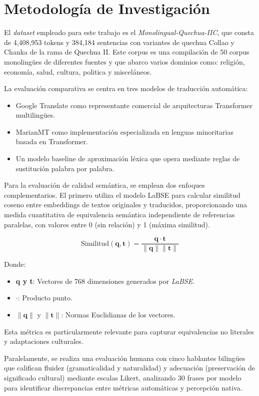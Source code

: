 \section{Metodología de Investigación}

El \textit{dataset} empleado para este trabajo es el \textit{Monolingual-Quechua-IIC}, que consta de 4,408,953 tokens y 384,184 sentencias con variantes de quechua Collao y Chanka de la rama de Quechua II. Este corpus es una compilación de 50 corpus monolingües de diferentes fuentes y que abarco varios dominios como: religión, economía, salud, cultura, politica y misceláneos.


La evaluación comparativa se centra en tres modelos de traducción automática:
\begin{itemize}
	\item Google Translate como representante comercial de arquitecturas Transformer multilingües.
	\item MarianMT como implementación especializada en lenguas minoritarias basada en Transformer.
	\item Un modelo baseline de aproximación léxica que opera mediante reglas de sustitución palabra por palabra.

\end{itemize}

Para la evaluación de calidad semántica, se emplean dos enfoques complementarios. El primero utiliza el modelo LaBSE para calcular similitud coseno entre embeddings de textos originales y traducidos, proporcionando una medida cuantitativa de equivalencia semántica independiente de referencias paralelas, con valores entre 0 (sin relación) y 1 (máxima similitud).

\[
	\text{Similitud}(\mathbf{q}, \mathbf{t}) = \frac{\mathbf{q} \cdot \mathbf{t}}{\|\mathbf{q}\| \|\mathbf{t}\|}
\]

Donde:
\begin{itemize}
	\item \textbf{q y t}: Vectores de 768 dimensiones generados por \textit{LaBSE}.
	\item $\cdot$: Producto punto.
	\item $\|\mathbf{q}\|$ y $\|\mathbf{t}\|$: Normas Euclidianas de los vectores.
\end{itemize}

Esta métrica es particularmente relevante para capturar equivalencias no literales y adaptaciones culturales.

Paralelamente, se realiza una evaluación humana con cinco hablantes bilingües que califican fluidez (gramaticalidad y naturalidad) y adecuación (preservación de significado cultural) mediante escalas Likert, analizando 30 frases por modelo para identificar discrepancias entre métricas automáticas y percepción nativa.

